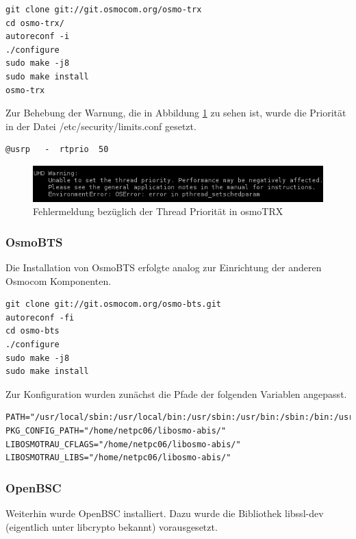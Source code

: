 \begin{lstlisting}
git clone git://git.osmocom.org/osmo-trx
cd osmo-trx/
autoreconf -i
./configure
sudo make -j8
sudo make install
osmo-trx	
\end{lstlisting}

Zur Behebung der Warnung, die in Abbildung \ref{fig:UHDWarnung} zu sehen ist, wurde die Priorität in der Datei /etc/security/limits.conf gesetzt.

\begin{lstlisting}
@usrp   -  rtprio  50
\end{lstlisting}

\begin{figure}[h] %
\centering
\includegraphics[width=15cm]{includes/uhd_usrp_warnung}
\caption{Fehlermeldung bezüglich der Thread Priorität in osmoTRX}
\label{fig:UHDWarnung}
\end{figure}

\subsubsection{OsmoBTS}
Die Installation von OsmoBTS erfolgte analog zur Einrichtung der anderen Osmocom Komponenten.

\begin{lstlisting}
git clone git://git.osmocom.org/osmo-bts.git
autoreconf -fi
cd osmo-bts
./configure
sudo make -j8
sudo make install
\end{lstlisting}

Zur Konfiguration wurden zunächst die Pfade der folgenden Variablen angepasst.

\begin{lstlisting}
PATH="/usr/local/sbin:/usr/local/bin:/usr/sbin:/usr/bin:/sbin:/bin:/usr/games:/usr/local/games"
PKG_CONFIG_PATH="/home/netpc06/libosmo-abis/"
LIBOSMOTRAU_CFLAGS="/home/netpc06/libosmo-abis/"
LIBOSMOTRAU_LIBS="/home/netpc06/libosmo-abis/"
\end{lstlisting}

\subsubsection{OpenBSC}
Weiterhin wurde OpenBSC installiert. Dazu wurde die Bibliothek libssl-dev (eigentlich unter libcrypto bekannt) vorausgesetzt.

